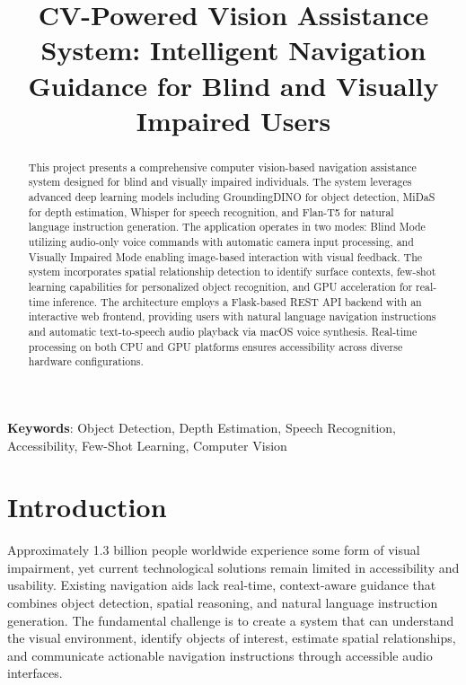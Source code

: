 \documentclass{article}
\title{CV-Powered Vision Assistance System: Intelligent Navigation Guidance for Blind and Visually Impaired Users}
\begin{document}
\maketitle

\begin{abstract}

This project presents a comprehensive computer vision-based navigation assistance system designed for blind and visually impaired individuals. The system leverages advanced deep learning models including GroundingDINO for object detection, MiDaS for depth estimation, Whisper for speech recognition, and Flan-T5 for natural language instruction generation. The application operates in two modes: Blind Mode utilizing audio-only voice commands with automatic camera input processing, and Visually Impaired Mode enabling image-based interaction with visual feedback. The system incorporates spatial relationship detection to identify surface contexts, few-shot learning capabilities for personalized object recognition, and GPU acceleration for real-time inference. The architecture employs a Flask-based REST API backend with an interactive web frontend, providing users with natural language navigation instructions and automatic text-to-speech audio playback via macOS voice synthesis. Real-time processing on both CPU and GPU platforms ensures accessibility across diverse hardware configurations.

\end{abstract}

\textbf{Keywords}: Object Detection, Depth Estimation, Speech Recognition, Accessibility, Few-Shot Learning, Computer Vision

\section{Introduction}
\label{sec:intro}

Approximately 1.3 billion people worldwide experience some form of visual impairment, yet current technological solutions remain limited in accessibility and usability. Existing navigation aids lack real-time, context-aware guidance that combines object detection, spatial reasoning, and natural language instruction generation. The fundamental challenge is to create a system that can understand the visual environment, identify objects of interest, estimate spatial relationships, and communicate actionable navigation instructions through accessible audio interfaces.
\end{document}
